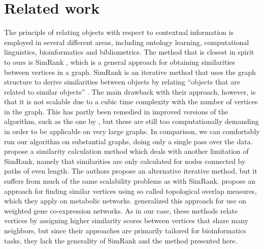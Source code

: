 \documentclass{sig-alternate}
\begin{document}
\section{Related work}
\label{sec:related work}


The principle of relating objects with respect to contextual information is employed in several different areas, including ontology
learning, computational linguistics, bioinformatics and bibliometrics. The method that is closest in spirit to
ours is SimRank \cite{Jeh2002simrank}, which is a general approach for obtaining similarities between vertices in a graph.
SimRank is an iterative method that uses the graph structure to derive similarities between objects by relating ``objects that are
related to similar objects'' \cite{Jeh2002simrank}. The main drawback with their approach, however, is that it is not scalable due to
a cubic time complexity with the number of vertices in the graph. This has partly been remedied in improved versions of the algorithm,
such as the one by \cite{Yu2012simrankOpt}, but these are still too computationally demanding in order to be applicable on
very large graphs. In comparison, we can comfortably run our algorithm on substantial graphs, doing only a single
pass over the data.
\cite{leicht2006vertex} propose a similarity calculation method which deals with another
limitation of SimRank, namely that similarities are only calculated for nodes connected by paths of
even length. The authors propose an alternative iterative method, but it suffers from much of the same scalability
problems as with SimRank.
\cite{ravasz2002hierarchical} propose an approach for finding similar vertices using so called
topological overlap measures, which they apply on metabolic networks. \cite{Zhang2005tom}
generalized this approach for use on weighted gene co-expression networks. As in our case, these methods relate vertices by assigning
higher similarity scores between vertices that share many neighbors, but since their approaches are primarily tailored for bioinformatics tasks,
they lack the generality of SimRank and the method presented here.
\end{document}
